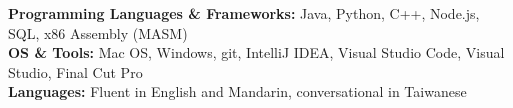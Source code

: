 

\begin{cvparagraph}

\textbf{Programming Languages \& Frameworks:} Java, Python, C++, Node.js,  SQL, x86 Assembly (MASM)
\\[2pt]
\textbf{OS \& Tools:} Mac OS, Windows, git, IntelliJ IDEA, Visual Studio Code, Visual Studio, Final Cut Pro
\\[2pt]
\textbf{Languages:} Fluent in English and Mandarin, conversational in Taiwanese
\\[2pt]


\end{cvparagraph}
